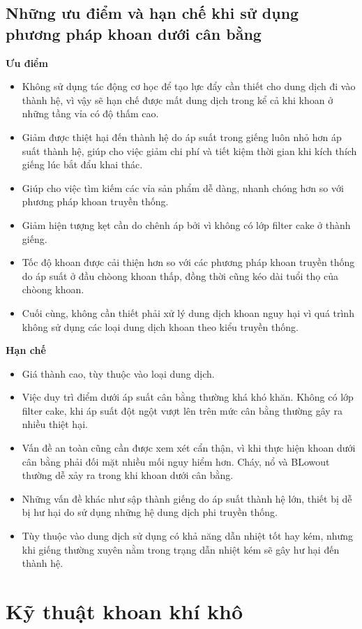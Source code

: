 \documentclass[13pt,a4paper]{article}
\begin{document}
\subsection{Những ưu điểm và hạn chế khi sử dụng phương pháp khoan dưới cân bằng}
	\textbf{Ưu điểm}
	\begin{itemize}
	\item Không sử dụng tác động cơ học để tạo lực đẩy cần thiết cho dung dịch đi vào thành hệ, vì vậy sẽ hạn chế được mất dung dịch trong kể cả khi khoan ở những tầng vỉa có độ thấm cao.
	\item Giảm được thiệt hại đến thành hệ do áp suất trong giếng luôn nhỏ hơn áp suất thành hệ, giúp cho việc giảm chi phí và tiết kiệm thời gian khi kích thích giếng lúc bắt đẩu khai thác. 
	\item Giúp cho việc tìm kiếm các vỉa sản phẩm dễ dàng, nhanh chóng hơn so với phương pháp khoan truyền thống.
	\item Giảm hiện tượng kẹt cần do chênh áp bởi vì không có lớp filter cake ở thành giếng.
	\item Tốc độ khoan được cải thiện hơn so với các phương pháp khoan truyền thống do áp suất ở đầu chòong khoan thấp, đồng thời cũng kéo dài tuổi thọ của chòong khoan.
	\item Cuối cùng, không cần thiết phải xử lý dung dịch khoan nguy hại vì quá trình không sử dụng các loại dung dịch khoan theo kiểu truyền thống.
	\end{itemize}
	\par
	\textbf{Hạn chế}
	\begin{itemize}
	\item Giá thành cao, tùy thuộc vào loại dung dịch.
	\item Việc duy trì điểm dưới áp suất cân bằng thường khá khó khăn. Không có lớp filter cake, khi áp suất đột ngột vượt lên trên mức cân bằng thường gây ra nhiều thiệt hại.
	\item Vấn đề an toàn cũng cần được xem xét cẩn thận, vì khi thực hiện khoan dưới cân bằng phải đối mặt nhiều mối nguy hiểm hơn. Cháy, nổ và BLowout thường dễ xảy ra trong khi khoan dưới cân bằng.
	\item Những vấn đề khác như sập thành giếng do áp suất thành hệ lớn, thiết bị dễ bị hư hại do sử dụng những hệ dung dịch phi truyền thống.
	\item Tùy thuộc vào dung dịch sử dụng có khả năng dẫn nhiệt tốt hay kém, nhưng khi giếng thường xuyên nằm trong trạng dẫn nhiệt kém sẽ gây hư hại đến thành hệ.
	\end{itemize}
\section{Kỹ thuật khoan khí khô}
\end{document}
